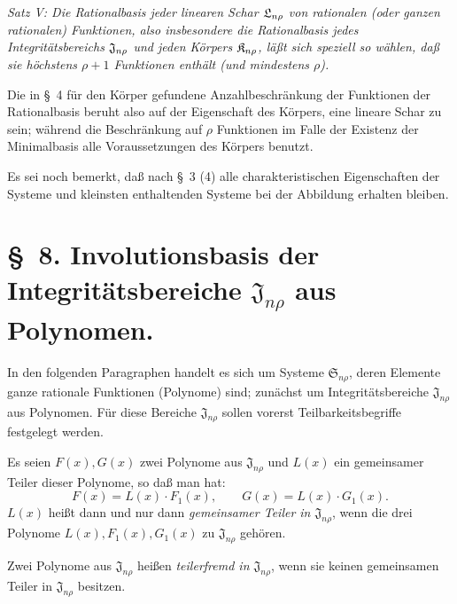 \emph{Satz V: Die Rationalbasis jeder linearen Schar $\Lsys_{n\rho}$ von rationalen (oder ganzen rationalen) Funktionen, also insbesondere die Rationalbasis jedes Integritätsbereichs $\Jdom_{n\rho}$ und jeden Körpers $\Kfield_{n\rho}$, läßt sich speziell so wählen, daß sie höchstens $\rho+1$ Funktionen enthält (und mindestens $\rho$).}

Die in \S\ 4 für den Körper gefundene Anzahlbeschränkung der Funktionen der Rationalbasis beruht also auf der Eigenschaft des Körpers, eine lineare Schar zu sein; während die Beschränkung auf $\rho$ Funktionen im Falle der Existenz der Minimalbasis alle Voraussetzungen des Körpers benutzt.

Es sei noch bemerkt, daß nach \S\ 3 (4) alle charakteristischen Eigenschaften der Systeme und kleinsten enthaltenden Systeme bei der Abbildung erhalten bleiben.

\clearpage
\providecommand{\Kfield}{\mathfrak{K}}
\providecommand{\Ssys}{\mathfrak{S}}
\providecommand{\Jdom}{\mathfrak{J}}
\providecommand{\Gdom}{\mathfrak{G}}
\providecommand{\Lsys}{\mathfrak{L}}
\providecommand{\Omegaint}{[\Omega]}
\providecommand{\eps}{\varepsilon}

\providecommand{\Kfield}{\mathfrak{K}}
\providecommand{\Ssys}{\mathfrak{S}}
\providecommand{\Jdom}{\mathfrak{J}}
\providecommand{\Gdom}{\mathfrak{G}}
\providecommand{\Lsys}{\mathfrak{L}}
\providecommand{\Omegaint}{[\Omega]}
\providecommand{\eps}{\varepsilon}

\section*{\S\ 8. Involutionsbasis der Integritätsbereiche $\Jdom_{n\rho}$ aus Polynomen.}

In den folgenden Paragraphen handelt es sich um Systeme $\Ssys_{n\rho}$, deren Elemente ganze rationale Funktionen (Polynome) sind; zunächst um Integritätsbereiche $\Jdom_{n\rho}$ aus Polynomen. Für diese Bereiche $\Jdom_{n\rho}$ sollen vorerst Teilbarkeitsbegriffe festgelegt werden.

Es seien $F(x),G(x)$ zwei Polynome aus $\Jdom_{n\rho}$ und $L(x)$ ein gemeinsamer Teiler dieser Polynome, so daß man hat:
\[
  F(x)=L(x)\cdot F_1(x),\qquad G(x)=L(x)\cdot G_1(x).
\]
$L(x)$ heißt dann und nur dann \emph{gemeinsamer Teiler in $\Jdom_{n\rho}$}, wenn die drei Polynome $L(x),F_1(x),G_1(x)$ zu $\Jdom_{n\rho}$ gehören.

Zwei Polynome aus $\Jdom_{n\rho}$ heißen \emph{teilerfremd in $\Jdom_{n\rho}$}, wenn sie keinen gemeinsamen Teiler in $\Jdom_{n\rho}$ besitzen.

